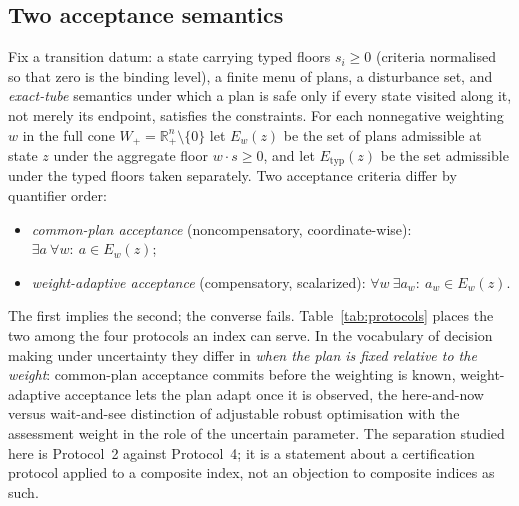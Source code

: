 \documentclass[preprint,11pt,authoryear]{elsarticle}
\theoremstyle{definition}
\theoremstyle{remark}
\newcommand{\Etyp}{E_{\mathrm{typ}}}
\newcommand{\Wp}{W_+}
\newcommand{\Rp}{\mathbb{R}^n_+}
\begin{document}
\subsection{Two acceptance semantics}

Fix a transition datum: a state carrying typed floors $s_i\ge0$ (criteria normalised so that zero is the binding level), a finite menu of plans, a disturbance set, and \emph{exact-tube} semantics under which a plan is safe only if every state visited along it, not merely its endpoint, satisfies the constraints. For each nonnegative weighting $w$ in the full cone $\Wp=\Rp\setminus\{0\}$ let $E_w(z)$ be the set of plans admissible at state $z$ under the aggregate floor $w\cdot s\ge0$, and let $\Etyp(z)$ be the set admissible under the typed floors taken separately. Two acceptance criteria differ by quantifier order:
\begin{itemize}[leftmargin=2em]
\item \emph{common-plan acceptance} (noncompensatory, coordinate-wise): $\exists a\ \forall w:\ a\in E_w(z)$;
\item \emph{weight-adaptive acceptance} (compensatory, scalarized): $\forall w\ \exists a_w:\ a_w\in E_w(z)$.
\end{itemize}
The first implies the second; the converse fails. Table~\ref{tab:protocols} places the two among the four protocols an index can serve. In the vocabulary of decision making under uncertainty they differ in \emph{when the plan is fixed relative to the weight}: common-plan acceptance commits before the weighting is known, weight-adaptive acceptance lets the plan adapt once it is observed, the here-and-now versus wait-and-see distinction of adjustable robust optimisation \citep{BenTal2004} with the assessment weight in the role of the uncertain parameter. The separation studied here is Protocol~2 against Protocol~4; it is a statement about a certification protocol applied to a composite index, not an objection to composite indices as such.
\end{document}
